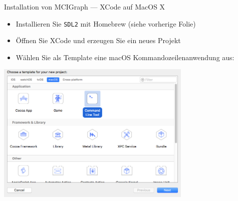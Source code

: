 \documentclass[presentation]{beamer}
\begin{document}
\begin{frame}[label={sec:org09fa11b},fragile]{Installation von MCIGraph --- XCode auf MacOS X}
 \begin{itemize}
\item Installieren Sie {\color{solarizedYellow}\texttt{SDL2} }mit Homebrew (siehe vorherige Folie)
\item Öffnen Sie XCode und erzeugen Sie ein neues Projekt
\item Wählen Sie als Template eine macOS Kommandozeilenanwendung aus:
\end{itemize}
\begin{center}\begin{center}
\includegraphics[width=0.7\textwidth]{xcode_images/template.png}
\end{center}\end{center}
\end{frame}
\end{document}
